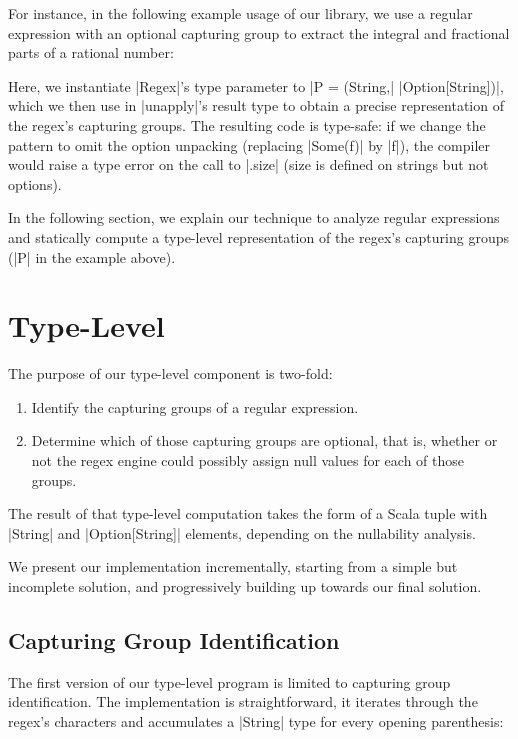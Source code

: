 For instance, in the following example usage of our library, we use a regular expression with an optional capturing group to extract the integral and fractional parts of a rational number:

\regexRational

\noindent
Here, we instantiate |Regex|'s type parameter to |P = (String,| |Option[String])|, which we then use in |unapply|'s result type to obtain a precise representation of the regex's capturing groups.
The resulting code is type-safe: if we change the pattern to omit the option unpacking (replacing |Some(f)| by |f|), the compiler would raise a type error on the call to |.size| (size is defined on strings but not options).

In the following section, we explain our technique to analyze regular expressions and statically compute a type-level representation of the regex's capturing groups (|P| in the example above).

\section{Type-Level}
\label{sec:type-level}

The purpose of our type-level component is two-fold:

\begin{enumerate}
  \item Identify the capturing groups of a regular expression.
  \item Determine which of those capturing groups are optional, that is, whether or not the regex engine could possibly assign null values for each of those groups.
\end{enumerate}

\noindent
The result of that type-level computation takes the form of a Scala tuple with |String| and |Option[String]| elements, depending on the nullability analysis.

We present our implementation incrementally, starting from a simple but incomplete solution, and progressively building up towards our final solution.

\subsection{Capturing Group Identification}

The first version of our type-level program is limited to capturing group identification.
The implementation is straightforward, it iterates through the regex's characters and accumulates a |String| type for every opening parenthesis:

